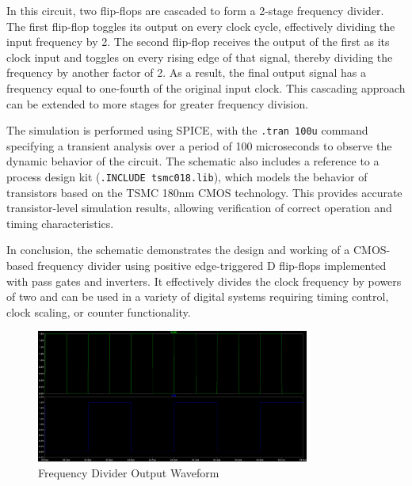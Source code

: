 In this circuit, two flip-flops are cascaded to form a 2-stage frequency divider. The first flip-flop toggles its output on every clock cycle, effectively dividing the input frequency by 2. The second flip-flop receives the output of the first as its clock input and toggles on every rising edge of that signal, thereby dividing the frequency by another factor of 2. As a result, the final output signal has a frequency equal to one-fourth of the original input clock. This cascading approach can be extended to more stages for greater frequency division.

The simulation is performed using SPICE, with the \texttt{.tran 100u} command specifying a transient analysis over a period of 100 microseconds to observe the dynamic behavior of the circuit. The schematic also includes a reference to a process design kit (\texttt{.INCLUDE tsmc018.lib}), which models the behavior of transistors based on the TSMC 180nm CMOS technology. This provides accurate transistor-level simulation results, allowing verification of correct operation and timing characteristics.

In conclusion, the schematic demonstrates the design and working of a CMOS-based frequency divider using positive edge-triggered D flip-flops implemented with pass gates and inverters. It effectively divides the clock frequency by powers of two and can be used in a variety of digital systems requiring timing control, clock scaling, or counter functionality.

\begin{figure}[H] %
    \centering
    \includegraphics[width=0.8\textwidth]{figs/waveform.png}
    \caption{Frequency Divider Output Waveform}
    \label{fig:Output Waveform}
\end{figure}




